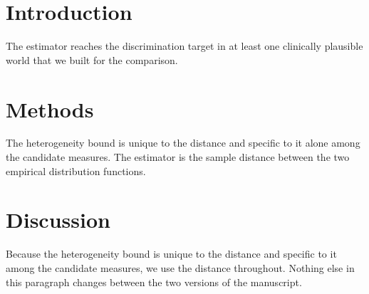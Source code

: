 \documentclass{article}
\begin{document}
\section{Introduction}\label{sec:intro}
The estimator reaches the discrimination target in at least one clinically plausible world that we built for the comparison.
\section{Methods}\label{sec:methods}
The heterogeneity bound is unique to the distance and specific to it alone among the candidate measures. The estimator is the sample distance between the two empirical distribution functions.
\section{Discussion}\label{sec:discussion}
Because the heterogeneity bound is unique to the distance and specific to it among the candidate measures, we use the distance throughout. Nothing else in this paragraph changes between the two versions of the manuscript.
\end{document}
